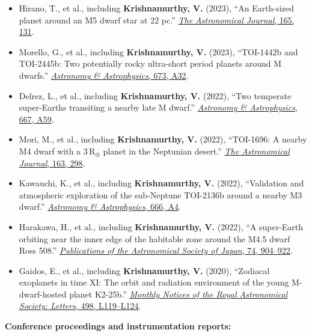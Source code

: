\documentclass[10pt,a4paper]{article}
\begin{document}
\begin{itemize}
\item
Hirano, T., et al., including \textbf{Krishnamurthy, V.} (2023),
``An Earth-sized planet around an M5 dwarf star at 22 pc.''
\href{https://doi.org/10.3847/1538-3881/acb7e1}
{\emph{The Astronomical Journal}, 165, 131}.

\item
Morello, G., et al., including \textbf{Krishnamurthy, V.} (2023),
``TOI-1442b and TOI-2445b: Two potentially rocky ultra-short period planets
around M dwarfs.''
\href{https://doi.org/10.1051/0004-6361/202243592}
{\emph{Astronomy \& Astrophysics}, 673, A32}.

\item
Delrez, L., et al., including \textbf{Krishnamurthy, V.} (2022),
``Two temperate super-Earths transiting a nearby late M dwarf.''
\href{https://doi.org/10.1051/0004-6361/202244041}
{\emph{Astronomy \& Astrophysics}, 667, A59}.

\item
Mori, M., et al., including \textbf{Krishnamurthy, V.} (2022),
``TOI-1696: A nearby M4 dwarf with a 3\,R$_{\oplus}$ planet in the
Neptunian desert.''
\href{https://doi.org/10.3847/1538-3881/ac6bf8}
{\emph{The Astronomical Journal}, 163, 298}.

\item
Kawauchi, K., et al., including \textbf{Krishnamurthy, V.} (2022),
``Validation and atmospheric exploration of the sub-Neptune TOI-2136b
around a nearby M3 dwarf.''
\href{https://doi.org/10.1051/0004-6361/202243381}
{\emph{Astronomy \& Astrophysics}, 666, A4}.

\item
Harakawa, H., et al., including \textbf{Krishnamurthy, V.} (2022),
``A super-Earth orbiting near the inner edge of the habitable zone
around the M4.5 dwarf Ross 508.''
\href{https://doi.org/10.1093/pasj/psac044}
{\emph{Publications of the Astronomical Society of Japan}, 74, 904--922}.

\item
Gaidos, E., et al., including \textbf{Krishnamurthy, V.} (2020),
``Zodiacal exoplanets in time XI: The orbit and radiation environment
of the young M-dwarf-hosted planet K2-25b.''
\href{https://doi.org/10.1093/mnrasl/slaa136}
{\emph{Monthly Notices of the Royal Astronomical Society: Letters},
498, L119--L124}.

\end{itemize}

\textbf{Conference proceedings and instrumentation reports:}
\end{document}
